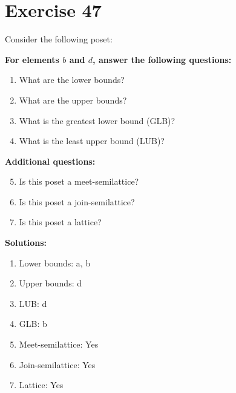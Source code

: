 \documentclass{article}
\begin{document}
\section*{Exercise 47}
Consider the following poset:
\begin{center}
\end{center}

    \textbf{For elements $b$ and $d$, answer the following questions:}
\begin{enumerate}
    \item What are the lower bounds?
    \item What are the upper bounds?
    \item What is the greatest lower bound (GLB)?
    \item What is the least upper bound (LUB)?
\end{enumerate}
    \hspace*{3ex} \textbf{Additional questions:}
\begin{enumerate}
    \setcounter{enumi}{4}
    \item Is this poset a meet-semilattice?
    \item Is this poset a join-semilattice?
    \item Is this poset a lattice?
\end{enumerate}

\textbf{Solutions:}
\begin{enumerate}
    \item Lower bounds: {a, b}
    \item Upper bounds: {d}
    \item LUB: d
    \item GLB: b
    \item Meet-semilattice: Yes
    \item Join-semilattice: Yes
    \item Lattice: Yes
\end{enumerate}
\newpage
\end{document}
